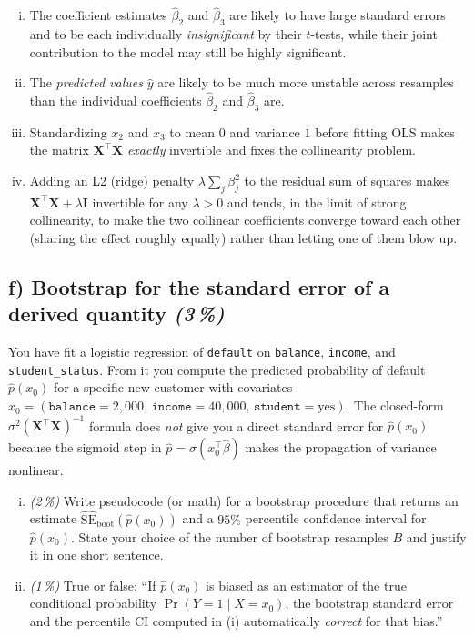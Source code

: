 \documentclass[11pt,a4paper]{article}
\newcommand{\subpoints}[1]{\textit{(#1\,\%)}}
\begin{document}
\begin{enumerate}[(i)]
  \item The coefficient estimates $\hat\beta_2$ and $\hat\beta_3$ are likely to have large standard errors and to be each individually \emph{insignificant} by their $t$-tests, while their joint contribution to the model may still be highly significant.
  \item The \emph{predicted values} $\hat y$ are likely to be much more unstable across resamples than the individual coefficients $\hat\beta_2$ and $\hat\beta_3$ are.
  \item Standardizing $x_2$ and $x_3$ to mean $0$ and variance $1$ before fitting OLS makes the matrix $\mathbf{X}^\top\mathbf{X}$ \emph{exactly} invertible and fixes the collinearity problem.
  \item Adding an L2 (ridge) penalty $\lambda\sum_j\beta_j^2$ to the residual sum of squares makes $\mathbf{X}^\top\mathbf{X} + \lambda\mathbf{I}$ invertible for any $\lambda > 0$ and tends, in the limit of strong collinearity, to make the two collinear coefficients converge toward each other (sharing the effect roughly equally) rather than letting one of them blow up.
\end{enumerate}

\subsection*{f) Bootstrap for the standard error of a derived quantity \subpoints{3}}
You have fit a logistic regression of \texttt{default} on \texttt{balance}, \texttt{income}, and \texttt{student\_status}. From it you compute the predicted probability of default $\hat p(x_0)$ for a specific new customer with covariates $x_0 = (\texttt{balance}=2{,}000,\, \texttt{income}=40{,}000,\, \texttt{student}=\mathrm{yes})$. The closed-form $\sigma^2(\mathbf{X}^\top\mathbf{X})^{-1}$ formula does \emph{not} give you a direct standard error for $\hat p(x_0)$ because the sigmoid step in $\hat p = \sigma(x_0^\top\hat\beta)$ makes the propagation of variance nonlinear.

\begin{enumerate}[(i)]
  \item \subpoints{2} Write pseudocode (or math) for a bootstrap procedure that returns an estimate $\widehat{\mathrm{SE}}_{\text{boot}}(\hat p(x_0))$ and a $95\%$ percentile confidence interval for $\hat p(x_0)$. State your choice of the number of bootstrap resamples $B$ and justify it in one short sentence.
  \item \subpoints{1} True or false: ``If $\hat p(x_0)$ is biased as an estimator of the true conditional probability $\Pr(Y = 1 \mid X = x_0)$, the bootstrap standard error and the percentile CI computed in (i) automatically \emph{correct} for that bias.''
\end{enumerate}
\end{document}
